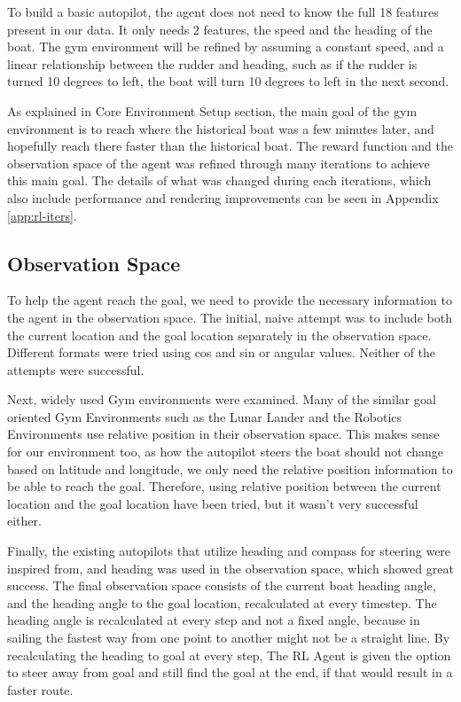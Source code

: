 \documentclass[12pt,twoside]{report}
\begin{document}
To build a basic autopilot, the agent does not need to know the full 18 features present in our data. It only needs 2 features, the speed and the heading of the boat. The gym environment will be refined by assuming a constant speed, and a linear relationship between the rudder and heading, such as if the rudder is turned 10 degrees to left, the boat will turn 10 degrees to left in the next second.

As explained in Core Environment Setup section, the main goal of the gym environment is to reach where the historical boat was a few minutes later, and hopefully reach there faster than the historical boat. The reward function and the observation space of the agent was refined through many iterations to achieve this main goal. The details of what was changed during each iterations, which also include performance and rendering improvements can be seen in Appendix \ref{app:rl-iters}.

\subsection{Observation Space}
To help the agent reach the goal, we need to provide the necessary information to the agent in the observation space. The initial, naive attempt was to include both the current location and the goal location separately in the observation space. Different formats were tried using cos and sin or angular values. Neither of the attempts were successful.

Next, widely used Gym environments were examined. Many of the similar goal oriented Gym Environments such as the Lunar Lander \cite{LunarLander-v2} and the Robotics Environments \cite{gym-robotics} use relative position in their observation space. This makes sense for our environment too, as how the autopilot steers the boat should not change based on latitude and longitude, we only need the relative position information to be able to reach the goal. Therefore, using relative position between the current location and the goal location have been tried, but it wasn't very successful either. 

Finally, the existing autopilots that utilize heading and compass for steering were inspired from, and heading was used in the observation space, which showed great success. The final observation space consists of the current boat heading angle, and the heading angle to the goal location, recalculated at every timestep. The heading angle is recalculated at every step and not a fixed angle, because in sailing the fastest way from one point to another might not be a straight line. By recalculating the heading to goal at every step, The RL Agent is given the option to steer away from goal and still find the goal at the end, if that would result in a faster route.
\end{document}
